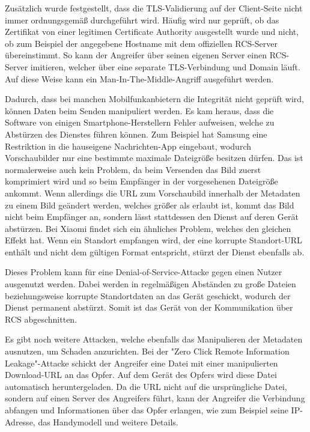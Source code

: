 \documentclass[conference]{IEEEtran}
\begin{document}
Zusätzlich wurde festgestellt, dass die TLS-Validierung auf der Client-Seite nicht immer ordnungsgemäß durchgeführt wird.
Häufig wird nur geprüft, ob das Zertifikat von einer legitimen Certificate Authority ausgestellt wurde und nicht, ob zum Beispiel der angegebene Hostname mit dem offiziellen RCS-Server übereinstimmt.
So kann der Angreifer über seinen eigenen Server einen RCS-Server imitieren, welcher über eine separate TLS-Verbindung und Domain läuft.
Auf diese Weise kann ein Man-In-The-Middle-Angriff ausgeführt werden.

Dadurch, dass bei manchen Mobilfunkanbietern die Integrität nicht geprüft wird, können Daten beim Senden manipuliert werden.
Es kam heraus, dass die Software von einigen Smartphone-Herstellern Fehler aufweisen, welche zu Abstürzen des Dienstes führen können.
Zum Beispiel hat Samsung eine Restriktion in die hauseigene Nachrichten-App eingebaut, wodurch Vorschaubilder nur eine bestimmte maximale Dateigröße besitzen dürfen.
Das ist normalerweise auch kein Problem, da beim Versenden das Bild zuerst komprimiert wird und so beim Empfänger in der vorgesehenen Dateigröße ankommt.
Wenn allerdings die URL zum Vorschaubild innerhalb der Metadaten zu einem Bild geändert werden, welches größer als erlaubt ist, kommt das Bild nicht beim Empfänger an, sondern lässt stattdessen den Dienst auf deren Gerät abstürzen.
Bei Xiaomi findet sich ein ähnliches Problem, welches den gleichen Effekt hat.
Wenn ein Standort empfangen wird, der eine korrupte Standort-URL enthält und nicht dem gültigen Format entspricht, stürzt der Dienst ebenfalls ab.

Dieses Problem kann für eine Denial-of-Service-Attacke gegen einen Nutzer ausgenutzt werden.
Dabei werden in regelmäßigen Abständen zu große Dateien beziehungsweise korrupte Standortdaten an das Gerät geschickt, wodurch der Dienst permanent abstürzt.
Somit ist das Gerät von der Kommunikation über RCS abgeschnitten.

Es gibt noch weitere Attacken, welche ebenfalls das Manipulieren der Metadaten ausnutzen, um Schaden anzurichten.
Bei der "Zero Click Remote Information Leakage"-Attacke schickt der Angreifer eine Datei mit einer manipulierten Download-URL an das Opfer.
Auf dem Gerät des Opfers wird diese Datei automatisch heruntergeladen.
Da die URL nicht auf die ursprüngliche Datei, sondern auf einen Server des Angreifers führt, kann der Angreifer die Verbindung abfangen und Informationen über das Opfer erlangen, wie zum Beispiel seine IP-Adresse, das Handymodell und weitere Details.
\end{document}

